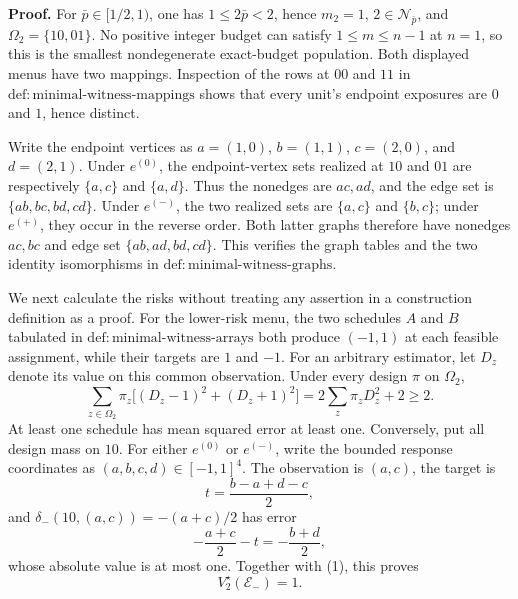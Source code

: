 \textbf{Proof.}
For \(\bar p\in[1/2,1)\), one has \(1\le2\bar p<2\), hence \(m_2=1\), \(2\in\mathcal N_{\bar p}\), and \(\Omega_2=\{10,01\}\).  No positive integer budget can satisfy \(1\le m\le n-1\) at \(n=1\), so this is the smallest nondegenerate exact-budget population.  Both displayed menus have two mappings.  Inspection of the rows at \(00\) and \(11\) in \(\mathrm{def{:}minimal\text{-}witness\text{-}mappings}\) shows that every unit's endpoint exposures are \(0\) and \(1\), hence distinct.

Write the endpoint vertices as \(a=(1,0)\), \(b=(1,1)\), \(c=(2,0)\), and \(d=(2,1)\).  Under \(e^{(0)}\), the endpoint-vertex sets realized at \(10\) and \(01\) are respectively \(\{a,c\}\) and \(\{a,d\}\).  Thus the nonedges are \(ac,ad\), and the edge set is \(\{ab,bc,bd,cd\}\).  Under \(e^{(-)}\), the two realized sets are \(\{a,c\}\) and \(\{b,c\}\); under \(e^{(+)}\), they occur in the reverse order.  Both latter graphs therefore have nonedges \(ac,bc\) and edge set \(\{ab,ad,bd,cd\}\).  This verifies the graph tables and the two identity isomorphisms in \(\mathrm{def{:}minimal\text{-}witness\text{-}graphs}\).

We next calculate the risks without treating any assertion in a construction definition as a proof.  For the lower-risk menu, the two schedules \(A\) and \(B\) tabulated in \(\mathrm{def{:}minimal\text{-}witness\text{-}arrays}\) both produce \((-1,1)\) at each feasible assignment, while their targets are \(1\) and \(-1\).  For an arbitrary estimator, let \(D_z\) denote its value on this common observation.  Under every design \(\pi\) on \(\Omega_2\),
\[
 \sum_{z\in\Omega_2}\pi_z
 \bigl[(D_z-1)^2+(D_z+1)^2\bigr]
 =2\sum_z\pi_zD_z^2+2\ge2. \tag{1}
\]
At least one schedule has mean squared error at least one.  Conversely, put all design mass on \(10\).  For either \(e^{(0)}\) or \(e^{(-)}\), write the bounded response coordinates as \((a,b,c,d)\in[-1,1]^4\).  The observation is \((a,c)\), the target is
\[
 t=\frac{b-a+d-c}{2},
\]
and \(\delta_-(10,(a,c))=-(a+c)/2\) has error
\[
 -\frac{a+c}{2}-t=-\frac{b+d}{2},
\]
whose absolute value is at most one.  Together with (1), this proves
\[
 V_2^\star(\mathcal E_-)=1. \tag{2}
\]

